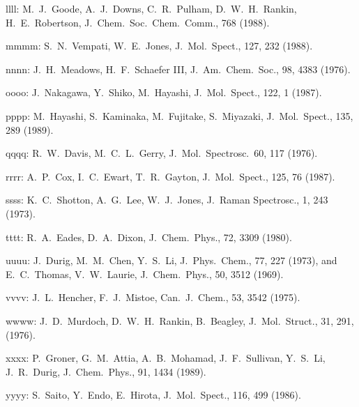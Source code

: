 \begin{description}
  
\item{llll: } M.\ J.\ Goode, A.\ J.\ Downs, C.\ R.\ Pulham, D.\ W.\ H.\ Rankin, H.\ E.\ Robertson,
       J.\ Chem.\ Soc.\ Chem.\ Comm., 768 (1988).
  
\item{mmmm: } S.\ N.\ Vempati, W.\ E.\ Jones, J.\ Mol.\ Spect., 127, 232 (1988).
  
\item{nnnn: } J.\ H.\ Meadows, H.\ F.\ Schaefer III, J.\ Am.\ Chem.\ Soc., 98, 4383 (1976).
  
\item{oooo: } J.\ Nakagawa, Y.\ Shiko, M.\ Hayashi, J.\ Mol.\ Spect., 122, 1 (1987).
  
\item{pppp: } M.\ Hayashi, S.\ Kaminaka, M.\ Fujitake, S.\ Miyazaki, J.\ Mol.\ Spect.,
      135, 289 (1989).
  
\item{qqqq: } R.\ W.\ Davis, M.\ C.\ L.\ Gerry, J.\ Mol.\ Spectrosc.\ 60, 117 (1976).
  
\item{rrrr: } A.\ P.\ Cox, I.\ C.\ Ewart, T.\ R.\ Gayton, J.\ Mol.\ Spect., 125, 76 (1987).
  
\item{ssss: } K.\ C.\ Shotton, A.\ G.\ Lee, W.\ J.\ Jones, J.\ Raman Spectrosc., 1, 243 (1973).
  
\item{tttt: } R.\ A.\ Eades, D.\ A.\ Dixon, J.\ Chem.\ Phys., 72, 3309 (1980).
  
\item{uuuu: } J.\ Durig, M.\ M.\ Chen, Y.\ S.\ Li, J.\ Phys.\ Chem., 77, 227 (1973), and
      E.\ C.\ Thomas, V.\ W.\ Laurie, J.\ Chem.\ Phys., 50, 3512 (1969).
  
\item{vvvv: } J.\ L.\ Hencher, F.\ J.\ Mistoe, Can.\ J.\ Chem., 53, 3542 (1975).
  
\item{wwww: } J.\ D.\ Murdoch, D.\ W.\ H.\ Rankin, B.\ Beagley, J.\ Mol.\ Struct.,
       31, 291, (1976).
  
\item{xxxx: } P.\ Groner, G.\ M.\ Attia, A.\ B.\ Mohamad, J.\ F.\ Sullivan,
       Y.\ S.\ Li, J.\ R.\ Durig, J.\ Chem.\ Phys., 91, 1434 (1989).
  
\item{yyyy: } S.\ Saito, Y.\ Endo, E.\ Hirota, J.\ Mol.\ Spect., 116, 499 (1986).
  

\end{description}
